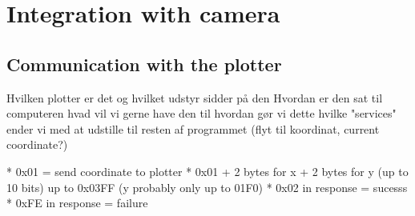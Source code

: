 
\section{Integration with camera}

\subsection{Communication with the plotter}
Hvilken plotter er det og hvilket udstyr sidder på den
Hvordan er den sat til computeren
hvad vil vi gerne have den til
hvordan gør vi dette
hvilke "services" ender vi med at udstille til resten af programmet (flyt til koordinat, current coordinate?)

*   0x01 = send coordinate to plotter
 *   0x01 + 2 bytes for x + 2 bytes for y (up to 10 bits) up to 0x03FF (y
probably only up to 01F0)
 *   0x02 in response = sucesss
 *   0xFE in response = failure
